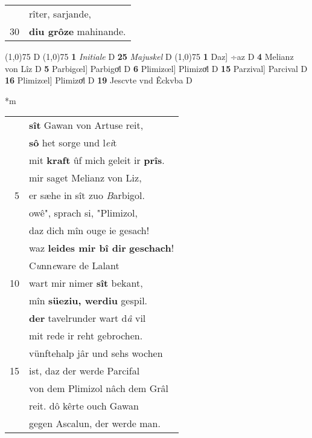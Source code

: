 \documentclass[8pt,a4paper,notitlepage]{article}
\begin{document}
\begin{table}[ht]
\begin{minipage}[t]{0.5\linewidth}
\begin{tabular}{rl}
 & rîter, sarjande,\\ 
30 & \textbf{diu grôze} mahinande.\\ 
\end{tabular}
\scriptsize
\line(1,0){75} \newline
D \newline
\line(1,0){75} \newline
\textbf{1} \textit{Initiale} D  \textbf{25} \textit{Majuskel} D  \newline
\line(1,0){75} \newline
\textbf{1} Daz] ÷az D \textbf{4} Melianz von Lîz D \textbf{5} Parbigœl] Parbigoͤl D \textbf{6} Plimizœl] Plimizoͤl D \textbf{15} Parzival] Parcival D \textbf{16} Plimizœl] Plimizoͤl D \textbf{19} Jescvte vnd Êckvba D \newline
\end{minipage}
\hspace{0.5cm}
\begin{minipage}[t]{0.5\linewidth}
\small
\begin{center}*m
\end{center}
\begin{tabular}{rl}
 & \textbf{sît} Gawan von Artuse reit,\\ 
 & \textbf{sô} het sorge und l\textit{ei}t\\ 
 & mit \textbf{kraft} ûf mich geleit ir \textbf{prîs}.\\ 
 & mir saget Melianz von Liz,\\ 
5 & er sæhe in sît zuo \textit{B}arbigol.\\ 
 & owê", sprach si, "Plimizol,\\ 
 & daz dich mîn ouge ie gesach!\\ 
 & waz \textbf{leides mir bî dir} \textbf{geschach}!\\ 
 & C\textit{u}nn\textit{e}ware de Lalant\\ 
10 & wart mir nimer \textbf{sît} bekant,\\ 
 & mîn \textbf{süeziu, werdiu} gespil.\\ 
 & \textbf{der} tavelrunder wart d\textit{â} vil\\ 
 & mit rede ir reht gebrochen.\\ 
 & vünftehalp jâr und sehs wochen\\ 
15 & ist, daz der werde Parcifal\\ 
 & von dem Plimizol nâch dem Grâl\\ 
 & reit. dô kêrte ouch Gawan\\ 
 & gegen Ascalun, der werde man.\\ 

\end{tabular}
\end{minipage}
\end{table}
\end{document}
